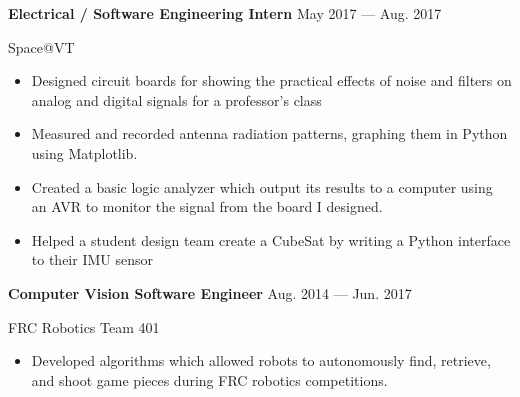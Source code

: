 \parbox[t][][t]{\linewidth}{
	\parbox{\linewidth}{\textbf{Electrical / Software Engineering Intern}
		\hfill {{May 2017 --- Aug. 2017}}}
	\smallbreak
	\parbox{\linewidth}{Space@VT}
	
	\bigskip
	\begin{itemize}
		\item{Designed circuit boards for showing the practical effects of noise and filters on analog and digital signals for a professor's class}\\[-.6em]
		
		\item{Measured and recorded antenna radiation patterns, graphing them in Python using Matplotlib.}\\[-.6em]
		
		\item{Created a basic logic analyzer which output its results to a computer using an AVR to monitor the signal from the board I designed.}\\[-.6em]
		
		\item{Helped a student design team create a CubeSat by writing a Python interface to their IMU sensor}
		
	\end{itemize}
	\bigskip
	\bigskip
}

\parbox[t][][t]{\linewidth}{
	\parbox{\linewidth}{\textbf{Computer Vision Software Engineer}
		\hfill {{Aug. 2014 --- Jun. 2017}}}
	\smallbreak
	\parbox{\linewidth}{FRC Robotics Team 401}
	
	\bigskip
		\begin{itemize}
	\item{Developed algorithms which allowed robots to autonomously find, retrieve, and shoot game pieces during FRC robotics competitions.}
		\end{itemize}
}